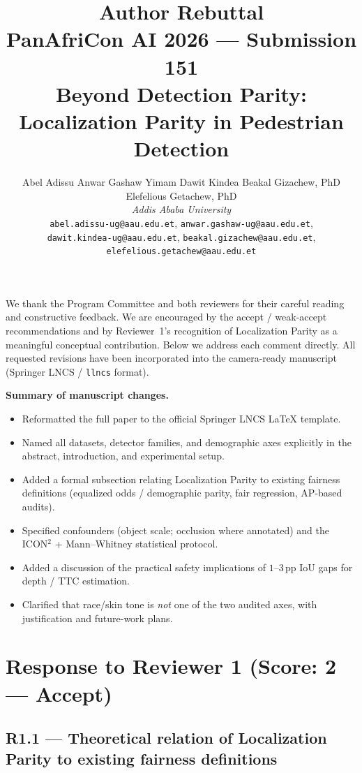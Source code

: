 \documentclass[11pt]{article}
\title{\textbf{Author Rebuttal}\\[0.35em]
\large PanAfriCon AI 2026 --- Submission 151\\[0.15em]
\normalsize Beyond Detection Parity: Localization Parity in Pedestrian Detection}
\author{Abel Adissu \quad Anwar Gashaw Yimam \quad Dawit Kindea \quad
Beakal Gizachew, PhD \quad Elefelious Getachew, PhD\\[0.25em]
\textit{Addis Ababa University}\\[0.15em]
\small\texttt{abel.adissu-ug@aau.edu.et},
\texttt{anwar.gashaw-ug@aau.edu.et},\\
\texttt{dawit.kindea-ug@aau.edu.et},
\texttt{beakal.gizachew@aau.edu.et},\\
\texttt{elefelious.getachew@aau.edu.et}}
\date{}
\begin{document}
\maketitle
\thispagestyle{empty}

\noindent We thank the Program Committee and both reviewers for their careful
reading and constructive feedback. We are encouraged by the accept / weak-accept
recommendations and by Reviewer~1's recognition of Localization Parity as a
meaningful conceptual contribution. Below we address each comment directly.
All requested revisions have been incorporated into the camera-ready manuscript
(Springer LNCS / \texttt{llncs} format).

\vspace{0.4em}
\noindent\textbf{Summary of manuscript changes.}
\begin{itemize}
\item Reformatted the full paper to the official Springer LNCS LaTeX template.
\item Named all datasets, detector families, and demographic axes explicitly in
      the abstract, introduction, and experimental setup.
\item Added a formal subsection relating Localization Parity to existing
      fairness definitions (equalized odds / demographic parity, fair regression,
      AP-based audits).
\item Specified confounders (object scale; occlusion where annotated) and the
      ICON$^2$ + Mann--Whitney statistical protocol.
\item Added a discussion of the practical safety implications of $1$--$3$\,pp
      IoU gaps for depth / TTC estimation.
\item Clarified that race/skin tone is \emph{not} one of the two audited axes,
      with justification and future-work plans.
\end{itemize}

\section*{Response to Reviewer 1 (Score: 2 --- Accept)}

\subsection*{R1.1 --- Theoretical relation of Localization Parity to existing fairness definitions}
\end{document}
